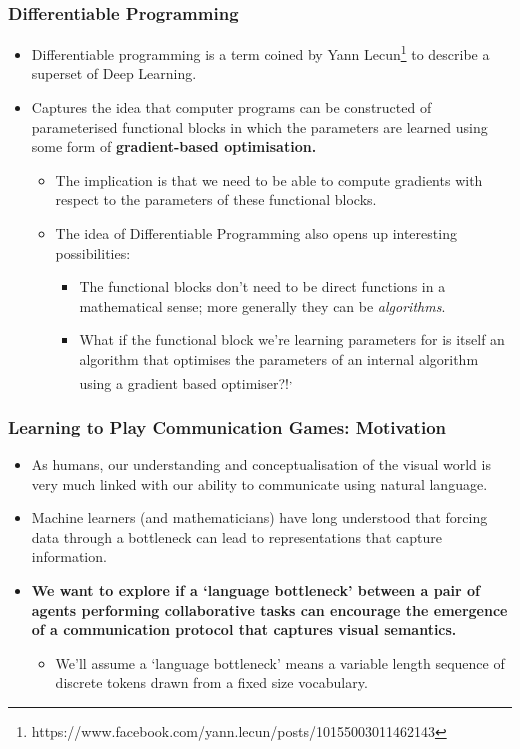 \documentclass[\beamerclass,aspectratio=1610]{beamer}
\begin{document}
\begin{frame}
\frametitle{Differentiable Programming}

\begin{itemize}
	\item Differentiable programming is a term coined by Yann Lecun\footnote{https://www.facebook.com/yann.lecun/posts/10155003011462143} to describe a superset of Deep Learning.
	\item Captures the idea that computer programs can be constructed of parameterised functional blocks in which the parameters are learned using some form of \textbf{gradient-based optimisation.}
	\begin{itemize}
		\item The implication is that we need to be able to compute gradients with respect to the parameters of these functional blocks. 
		\pause
		\item The idea of Differentiable Programming also opens up interesting possibilities: 
		\begin{itemize}
			\item The functional blocks don't need to be direct functions in a mathematical sense; more generally they can be \emph{algorithms}.
			\item What if the functional block we're learning parameters for is itself an algorithm that optimises the parameters of an internal algorithm using a gradient based optimiser?!\textsuperscript{,}
		\end{itemize}
	\end{itemize}
\end{itemize}
\end{frame}

\begin{frame}
\frametitle{Learning to Play Communication Games: Motivation}

\begin{itemize}
	\item As humans, our understanding and conceptualisation of the visual world is very much linked with our ability to communicate using natural language.
	\item Machine learners (and mathematicians) have long understood that forcing data through a bottleneck can lead to representations that capture information.
	\item \textbf{We want to explore if a `language bottleneck' between a pair of agents performing collaborative tasks can encourage the emergence of a communication protocol that captures visual semantics.}
	\begin{itemize}	
		\item We'll assume a `language bottleneck' means a variable length sequence of discrete tokens drawn from a fixed size vocabulary.
	\end{itemize}
\end{itemize}

\end{frame}
\end{document}
